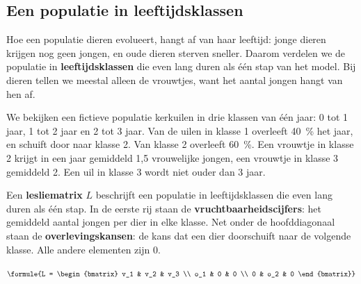 \subsection{Een populatie in leeftijdsklassen}

Hoe een populatie dieren evolueert, hangt af van haar leeftijd: jonge dieren krijgen nog geen jongen, en oude dieren sterven sneller. Daarom verdelen we de populatie in \textbf{leeftijdsklassen} die even lang duren als één stap van het model. Bij dieren tellen we meestal alleen de vrouwtjes, want het aantal jongen hangt van hen af.

We bekijken een fictieve populatie kerkuilen in drie klassen van één jaar: 0 tot 1 jaar, 1 tot 2 jaar en 2 tot 3 jaar. Van de uilen in klasse 1 overleeft 40~\% het jaar, en schuift door naar klasse 2. Van klasse 2 overleeft 60~\%. Een vrouwtje in klasse 2 krijgt in een jaar gemiddeld 1,5 vrouwelijke jongen, een vrouwtje in klasse 3 gemiddeld 2. Een uil in klasse 3 wordt niet ouder dan 3 jaar.


\begin{theorie}
Een \textbf{\textcolor{accent}{lesliematrix}} $L$ beschrijft een populatie in leeftijdsklassen die even lang duren als één stap. In de eerste rij staan de \textbf{\textcolor{accent}{vruchtbaarheidscijfers}}: het gemiddeld aantal jongen per dier in elke klasse. Net onder de hoofddiagonaal staan de \textbf{\textcolor{accent}{overlevingskansen}}: de kans dat een dier doorschuift naar de volgende klasse. Alle andere elementen zijn 0.

\vspace{1mm}
\qquad $\formule{L = \begin{bmatrix} v_1 & v_2 & v_3 \\ o_1 & 0 & 0 \\ 0 & o_2 & 0 \end{bmatrix}}$
\end{theorie}

